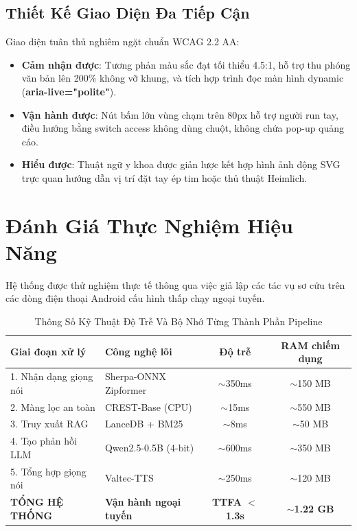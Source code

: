 \documentclass[journal]{IEEEtran}
\begin{document}
\subsection{Thiết Kế Giao Diện Đa Tiếp Cận}
Giao diện tuân thủ nghiêm ngặt chuẩn WCAG 2.2 AA:
\begin{itemize}
\item \textbf{Cảm nhận được}: Tương phản màu sắc đạt tối thiểu 4.5:1, hỗ trợ thu phóng văn bản lên 200\% không vỡ khung, và tích hợp trình đọc màn hình dynamic (\textbf{aria-live="polite"}).
\item \textbf{Vận hành được}: Nút bấm lớn vùng chạm trên 80px hỗ trợ người run tay, điều hướng bằng switch access không dùng chuột, không chứa pop-up quảng cáo.
\item \textbf{Hiểu được}: Thuật ngữ y khoa được giản lược kết hợp hình ảnh động SVG trực quan hướng dẫn vị trí đặt tay ép tim hoặc thủ thuật Heimlich.
\end{itemize}

\section{Đánh Giá Thực Nghiệm Hiệu Năng}
Hệ thống được thử nghiệm thực tế thông qua việc giả lập các tác vụ sơ cứu trên các dòng điện thoại Android cấu hình thấp chạy ngoại tuyến.

\begin{table}[t]
\centering
\caption{Thông Số Kỹ Thuật Độ Trễ Và Bộ Nhớ Từng Thành Phần Pipeline}
\label{tab:performance}
\begin{tabular}{llcc}
\toprule
\textbf{Giai đoạn xử lý} & \textbf{Công nghệ lõi} & \textbf{Độ trễ} & \textbf{RAM chiếm dụng} \\
\midrule
1. Nhận dạng giọng nói & Sherpa-ONNX Zipformer & $\sim$350ms & $\sim$150 MB \\
2. Màng lọc an toàn & CREST-Base (CPU) & $\sim$15ms & $\sim$550 MB \\
3. Truy xuất RAG & LanceDB + BM25 & $\sim$8ms & $\sim$50 MB \\
4. Tạo phản hồi LLM & Qwen2.5-0.5B (4-bit) & $\sim$600ms & $\sim$350 MB \\
5. Tổng hợp giọng nói & Valtec-TTS & $\sim$250ms & $\sim$120 MB \\
\midrule
\textbf{TỔNG HỆ THỐNG} & \textbf{Vận hành ngoại tuyến} & \textbf{TTFA $<$ 1.3s} & \textbf{$\sim$1.22 GB} \\
\bottomrule
\end{tabular}
\end{table}
\end{document}
